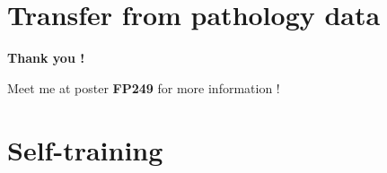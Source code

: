 \documentclass{beamer}
\begin{document}
\section{Transfer from pathology data}

\begin{frame}
	\vfill
	\begin{center}
		\large
		\textbf{Thank you !}
	\end{center}
	\vfill
	\begin{center}
	{Meet me at poster \textbf{FP249}} for more information !	
	\end{center}
\end{frame}

\section{Self-training}
\end{document}
